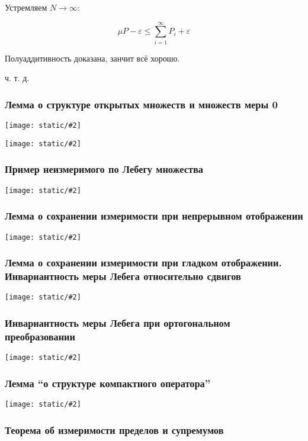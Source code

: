 \documentclass{article}
\def\images#1#2{\begin{center}\texttt{[image: static/\#2]}\end{center}}
\begin{document}
Устремляем $ N \rightarrow \infty$: 

\[\mu P - \varepsilon \le \sum_{i = 1}^{\infty} P_i + \varepsilon\]

Полуаддитивность доказана, занчит всё хорошо.

ч. т. д. 



\subsubsection{Лемма о структуре открытых множеств и множеств меры 0}

\images{0.95}{o_str_otkr_0_1.jpg}

\images{1}{o_str_otkr_0_2.jpg}


\subsubsection{Пример неизмеримого по Лебегу множества}

\images{0.95}{pr_neiz_leb_mn.jpg}


\subsubsection{Лемма о сохранении измеримости при непрерывном отображении}

\images{0.93}{soh_nepr_otob.jpg}

\subsubsection{Лемма о сохранении измеримости при гладком отображении. Инвариантность меры Лебега относительно сдвигов}

\images{0.93}{soh_gl_otob.jpg}

\subsubsection{Инвариантность меры Лебега при ортогональном преобразовании}

\images{0.95}{inv_mer_leb_ort.jpg}

\subsubsection{Лемма ``о структуре компактного оператора''}

\images{0.95}{str_komp_op.jpg}

\subsubsection{Теорема об измеримости пределов и супремумов}
\end{document}
